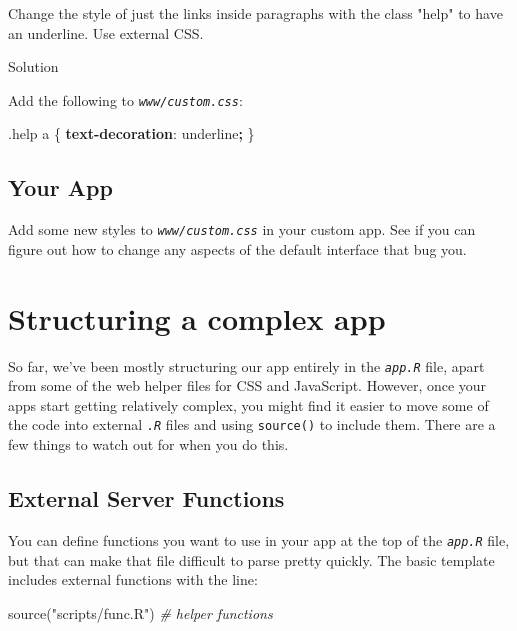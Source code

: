\documentclass[
  oneside]{book}
\newenvironment{Shaded}{\begin{snugshade}}{\end{snugshade}}
\newcommand{\AttributeTok}[1]{\textcolor[rgb]{0.77,0.63,0.00}{#1}}
\newcommand{\CommentTok}[1]{\textcolor[rgb]{0.56,0.35,0.01}{\textit{#1}}}
\newcommand{\DecValTok}[1]{\textcolor[rgb]{0.00,0.00,0.81}{#1}}
\newcommand{\FunctionTok}[1]{\textcolor[rgb]{0.00,0.00,0.00}{#1}}
\newcommand{\KeywordTok}[1]{\textcolor[rgb]{0.13,0.29,0.53}{\textbf{#1}}}
\newcommand{\NormalTok}[1]{#1}
\newcommand{\OperatorTok}[1]{\textcolor[rgb]{0.81,0.36,0.00}{\textbf{#1}}}
\newcommand{\StringTok}[1]{\textcolor[rgb]{0.31,0.60,0.02}{#1}}
\begin{document}
Change the style of just the links inside paragraphs with the \AttributeTok{class} \StringTok{"help"} to have an underline. Use external CSS.

Solution

Add the following to \textit{\texttt{www/custom.css}}:

\begin{Shaded}
\begin{Highlighting}[]
\FunctionTok{.help}\NormalTok{ a \{ }\KeywordTok{text{-}decoration}\NormalTok{: }\DecValTok{underline}\OperatorTok{;}\NormalTok{ \}}
\end{Highlighting}
\end{Shaded}

\hypertarget{your-app-web}{%
\section{Your App}\label{your-app-web}}

Add some new styles to \textit{\texttt{www/custom.css}} in your custom app. See if you can figure out how to change any aspects of the default interface that bug you.

\hypertarget{structure}{%
\chapter{Structuring a complex app}\label{structure}}

So far, we've been mostly structuring our app entirely in the \textit{\texttt{app.R}} file, apart from some of the web helper files for CSS and JavaScript. However, once your apps start getting relatively complex, you might find it easier to move some of the code into external \textit{\texttt{.R}} files and using \texttt{source()} to include them. There are a few things to watch out for when you do this.

\hypertarget{external-server-functions}{%
\section{External Server Functions}\label{external-server-functions}}

You can define functions you want to use in your app at the top of the \textit{\texttt{app.R}} file, but that can make that file difficult to parse pretty quickly. The basic template includes external functions with the line:

\begin{Shaded}
\begin{Highlighting}[]
\FunctionTok{source}\NormalTok{(}\StringTok{"scripts/func.R"}\NormalTok{) }\CommentTok{\# helper functions}
\end{Highlighting}
\end{Shaded}
\end{document}

